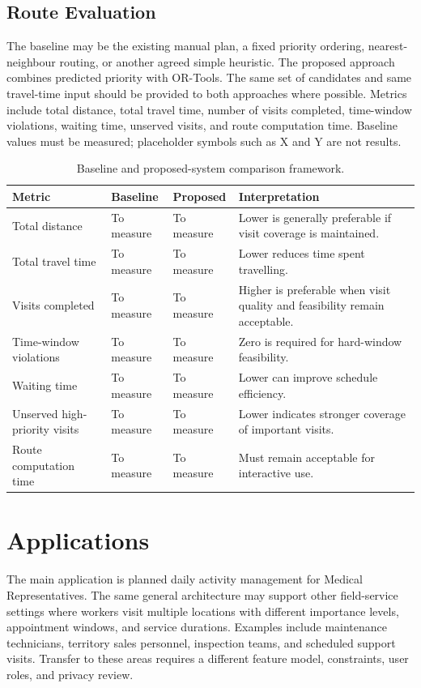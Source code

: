 \documentclass[12pt,a4paper,oneside]{report}
\begin{document}
\subsection{Route Evaluation}
The baseline may be the existing manual plan, a fixed priority ordering, nearest-neighbour routing, or another agreed simple heuristic. The proposed approach combines predicted priority with OR-Tools. The same set of candidates and same travel-time input should be provided to both approaches where possible. Metrics include total distance, total travel time, number of visits completed, time-window violations, waiting time, unserved visits, and route computation time. Baseline values must be measured; placeholder symbols such as X and Y are not results.

\begin{table}[htbp]
\centering
\begin{tabularx}{\textwidth}{p{39mm}p{33mm}p{33mm}X}
\toprule
\textbf{Metric} & \textbf{Baseline} & \textbf{Proposed} & \textbf{Interpretation}\\
\midrule
Total distance & To measure & To measure & Lower is generally preferable if visit coverage is maintained.\\
Total travel time & To measure & To measure & Lower reduces time spent travelling.\\
Visits completed & To measure & To measure & Higher is preferable when visit quality and feasibility remain acceptable.\\
Time-window violations & To measure & To measure & Zero is required for hard-window feasibility.\\
Waiting time & To measure & To measure & Lower can improve schedule efficiency.\\
Unserved high-priority visits & To measure & To measure & Lower indicates stronger coverage of important visits.\\
Route computation time & To measure & To measure & Must remain acceptable for interactive use.\\
\bottomrule
\end{tabularx}
\caption{Baseline and proposed-system comparison framework.}
\end{table}

\section{Applications}
The main application is planned daily activity management for Medical Representatives. The same general architecture may support other field-service settings where workers visit multiple locations with different importance levels, appointment windows, and service durations. Examples include maintenance technicians, territory sales personnel, inspection teams, and scheduled support visits. Transfer to these areas requires a different feature model, constraints, user roles, and privacy review.
\end{document}
